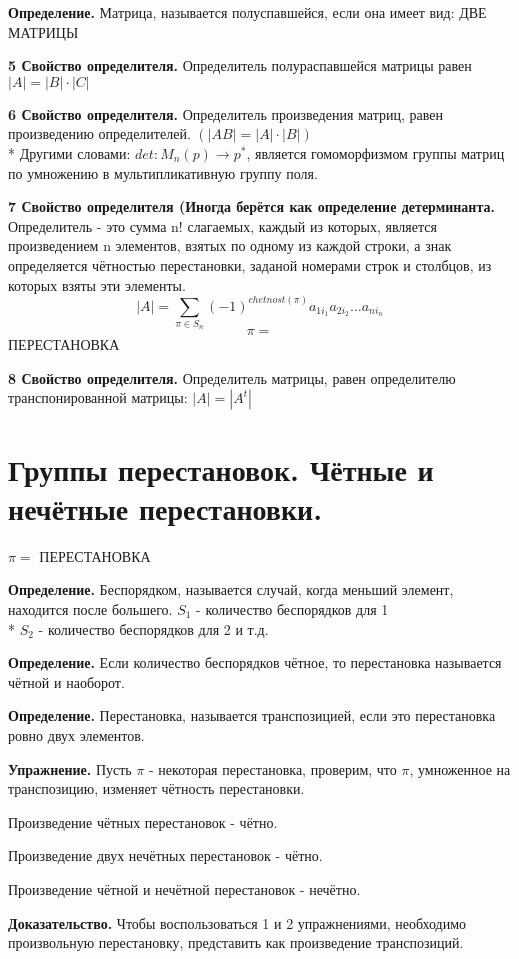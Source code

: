 \documentclass{article}
\begin{document}
{\bf Определение.} Матрица, называется полуспавшейся, если она имеет вид: ДВЕ МАТРИЦЫ

{\bf 5 Свойство определителя.} Определитель полураспавшейся матрицы равен $|A|=|B|\cdot|C|$

{\bf 6 Свойство определителя.} Определитель произведения матриц, равен произведению определителей. $(|AB|=|A|\cdot|B|)$\\*
Другими словами: $det:M_n(p)\to p^*$, является гомоморфизмом группы матриц по умножению в мультипликативную группу поля.

{\bf 7 Свойство определителя (Иногда берётся как определение детерминанта.} Определитель - это сумма n! слагаемых, каждый из которых, является произведением n элементов, взятых по одному из каждой строки, а знак определяется чётностью перестановки, заданой номерами строк и столбцов, из которых  взяты эти элементы.
$$|A|=\sum_{\pi \in S_n} (-1)^{chetnost(\pi)}a_{1i_1}a_{2i_2}\ldots a_{ni_n}$$
$$\pi=$$ ПЕРЕСТАНОВКА

{\bf 8 Свойство определителя.} Определитель матрицы, равен определителю транспонированной матрицы: $|A|=|A^t|$
\section*{Группы перестановок. Чётные и нечётные перестановки.}
$\pi=$ ПЕРЕСТАНОВКА

{\bf Определение.} Беспорядком, называется случай, когда меньший элемент, находится после большего. $S_1$ - количество беспорядков для 1\\*
$S_2$ - количество беспорядков для 2 и т.д.

{\bf Определение.} Если количество беспорядков чётное, то перестановка называется чётной и наоборот.

{\bf Определение.} Перестановка, называется транспозицией, если это перестановка ровно двух элементов.

{\bf Упражнение.} Пусть $\pi$ - некоторая перестановка, проверим, что $\pi$, умноженное на транспозицию, изменяет  чётность перестановки.

Произведение чётных перестановок - чётно.


Произведение двух нечётных перестановок - чётно.


Произведение чётной и нечётной перестановок - нечётно.

{\bf Доказательство.} Чтобы воспользоваться 1 и 2 упражнениями, необходимо произвольную перестановку, представить как произведение транспозиций.
\end{document}
